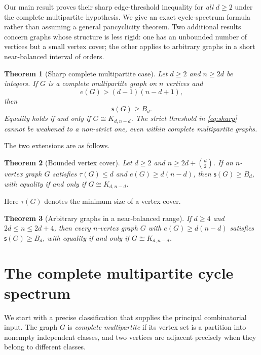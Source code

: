 \documentclass[11pt,letterpaper]{article}
\newtheorem{theorem}{Theorem}[section]
\newcommand{\hc}{\mathsf{s}}
\newcommand{\edges}{e}
\newcommand{\vcover}{\tau}
\begin{document}
Our main result proves their sharp edge-threshold inequality for 
\emph{all} $d\ge2$ under the complete multipartite hypothesis.  We give an exact
cycle-spectrum formula rather than assuming a general pancyclicity theorem.
Two additional results concern graphs whose structure is less rigid: one has an
unbounded number of vertices but a small vertex cover; the other applies to
arbitrary graphs in a short near-balanced interval of orders.

\begin{theorem}[Sharp complete multipartite case]\label{thm:main}
Let $d\ge 2$ and $n\ge2d$ be integers.  If $G$ is a complete multipartite graph
on $n$ vertices and
\begin{equation}\label{eq:sharp}
\edges(G)>(d-1)(n-d+1),
\end{equation}
then
\[
\hc(G)\ge B_d.
\]
Equality holds if and only if $G\cong K_{d,n-d}$.
The strict threshold in \eqref{eq:sharp} cannot be weakened to a non-strict one,
even within complete multipartite graphs.
\end{theorem}

The two extensions are as follows.
\begin{theorem}[Bounded vertex cover]\label{thm:cover}
Let $d\ge2$ and $n\ge2d+\binom d2$.  If an $n$-vertex graph $G$ satisfies
$\vcover(G)\le d$ and $\edges(G)\ge d(n-d)$, then
$\hc(G)\ge B_d$, with equality if and only if $G\cong K_{d,n-d}$.
\end{theorem}
Here $\vcover(G)$ denotes the minimum size of a vertex cover.

\begin{theorem}[Arbitrary graphs in a near-balanced range]\label{thm:band}
If $d\ge4$ and $2d\le n\le2d+4$, then every $n$-vertex graph $G$ with
$\edges(G)\ge d(n-d)$ satisfies $\hc(G)\ge B_d$, with equality
if and only if $G\cong K_{d,n-d}$.
\end{theorem}

\section{The complete multipartite cycle spectrum}
We start with a precise classification that supplies the principal combinatorial
input.  The graph $G$ is \emph{complete multipartite} if its vertex set is a
partition into nonempty independent classes, and two vertices are adjacent precisely
when they belong to different classes.
\end{document}
